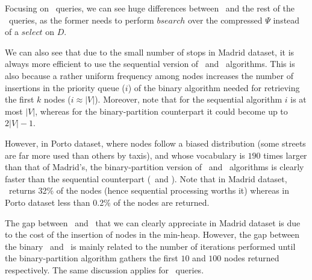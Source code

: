 

Focusing on \Stk\ queries, we can see huge differences between \Stks\  
and the rest of the \Stk\ queries, as the former needs to perform {$ bsearch$} over the compressed $\Psi$
instead of a $select$ on $D$. 

We can also see that due to the small number of stops in Madrid dataset, it is always more efficient 
to use the sequential version of \Stks\ and \Stk\ algorithms. This is also because a rather uniform frequency among nodes 
increases the number of insertions in the priority queue ($i$) of the binary algorithm
needed for retrieving the first $k$ nodes ($i \approx |V|$). Moreover, note that for the sequential algorithm 
$i$ is  at most $|V|$, whereas for the binary-partition counterpart it could become up to $2|V|-1$.


However, in Porto dataset, where nodes follow a biased distribution (some streets are far more used than others
by taxis), and whose vocabulary 
is $190$ times larger than that of Madrid's, the binary-partition version of \Stks\ and \Stk\ algorithms is clearly
faster than the sequential counterpart (\Stkseq\ and \Stksseq).
Note that in Madrid dataset, \Stcien\ returns 32\% of the nodes (hence sequential processing worths it) 
whereas in Porto dataset less than 0.2\% of the nodes are returned. 

The gap between \Stdiezseq\ and \Stcienseq\ that we can clearly appreciate in Madrid dataset 
is due to the cost of the insertion of nodes in the min-heap. However, the gap between 
the binary \Stdiez\ and \Stcien\ 
is mainly related to the number of iterations performed until the binary-partition algorithm gathers the first
$10$ and $100$ {nodes}  returned respectively. The same discussion applies for \Stks\ queries.






